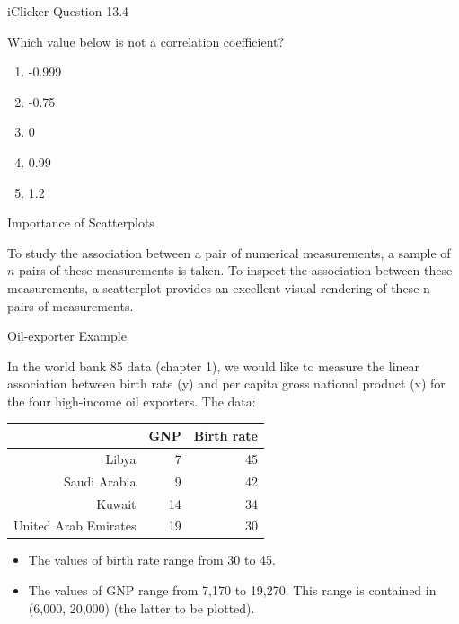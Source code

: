 \documentclass[14pt]{beamer}\usepackage[]{graphicx}\usepackage[]{color}
\begin{document}
\begin{frame}[fragile]{iClicker Question 13.4}

Which value below is not a correlation coefficient?

\begin{enumerate}
\item -0.999
\item -0.75
\item 0
\item 0.99
\item 1.2
\end{enumerate}
\end{frame}

\begin{frame}[fragile]{Importance of Scatterplots}

To study the association between a pair of numerical measurements, a  sample of $n$ pairs of these measurements is taken. To inspect the  association between these measurements, a scatterplot provides an  excellent visual rendering of these n pairs of measurements.

\end{frame}

\begin{frame}[fragile]{Oil-exporter Example}

{\small{
In the world bank 85 data (chapter 1), we would like to measure the linear  association between birth rate (y) and per capita gross national product  (x) for the four high-income oil exporters. The data:
}}

{\small{
\begin{table}[ht]
\centering
\begin{tabular}{rrr}
  \hline
 & GNP & Birth rate \\ 
  \hline
Libya & 7 & 45 \\ 
  Saudi Arabia & 9 & 42 \\ 
  Kuwait & 14 & 34 \\ 
  United Arab Emirates & 19 & 30 \\ 
   \hline
\end{tabular}
\end{table}

}}

{\small{
\begin{itemize}
\item The values of birth rate range from 30 to 45.

\item The values of GNP range from 7,170 to 19,270. This range is  contained in (6,000, 20,000) (the latter to be plotted).
\end{itemize}
}}
\end{frame}
\end{document}
